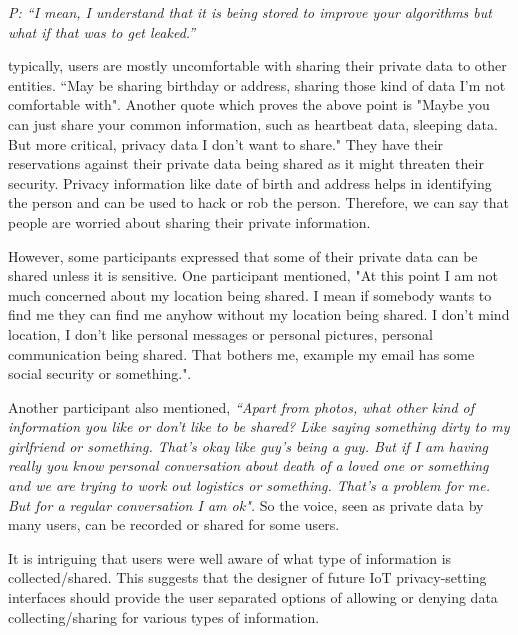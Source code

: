 \textit{P: ``I mean, I understand that it is being stored to improve your algorithms but what if that was to get leaked.''\\}

typically, users are mostly uncomfortable with sharing their private data to other entities. ``May be sharing birthday or address, sharing those kind of data I'm not comfortable with". Another quote which proves the above point is "Maybe you can just share your common information, such as heartbeat data, sleeping data. But more critical, privacy data I don't want to share." They have their reservations against their private data being shared as it might threaten their security. Privacy information like date of birth and address helps in identifying the person and can be used to hack or rob the person. Therefore, we can say that people are worried about sharing their private information.

However, some participants expressed that some of their private data can be shared unless it is sensitive. One participant mentioned, "At this point I am not much concerned about my location being shared. I mean if somebody wants to find me they can find me anyhow without my location being shared. I don't mind location, I don't like personal messages or personal pictures, personal communication being shared. That bothers me, example my email has some social security or something.".

Another participant also mentioned, \textit {``Apart from photos, what other kind of information you like or don't like to be shared? Like saying something dirty to my girlfriend or something. That's okay like guy's being a guy. But if I am having really you know personal conversation about death of a loved one or something and we are trying to work out logistics or something. That's a problem for me. But for a regular conversation I am ok".} So the voice, seen as private data by many users, can be recorded or shared for some users.

It is intriguing that users were well aware of what type of information is collected/shared. This suggests that the designer of future IoT privacy-setting interfaces should provide the user separated options of allowing or denying data collecting/sharing for various types of information.

